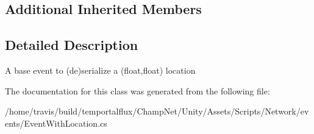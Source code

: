 \subsection*{Additional Inherited Members}


\subsection{Detailed Description}
A base event to (de)serialize a (float,float) location 

The documentation for this class was generated from the following file\-:\begin{DoxyCompactItemize}
\item 
/home/travis/build/temportalflux/\-Champ\-Net/\-Unity/\-Assets/\-Scripts/\-Network/events/Event\-With\-Location.\-cs\end{DoxyCompactItemize}
